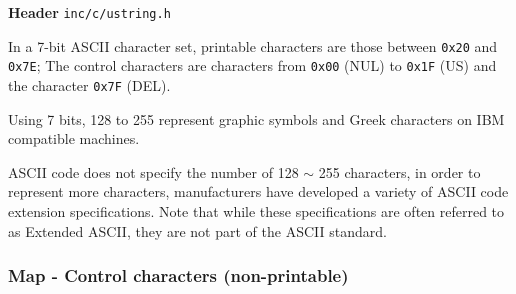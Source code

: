 \textbf{Header} \verb|inc/c/ustring.h|

In a 7-bit ASCII character set, printable characters are those between \verb|0x20| and \verb|0x7E|; The control characters are characters from \verb|0x00| (NUL) to \verb|0x1F| (US) and the character \verb|0x7F| (DEL).

Using 7 bits, 128 to 255 represent graphic symbols and Greek characters on IBM compatible machines.

ASCII code does not specify the number of 128 $\sim$ 255 characters, in order to represent more characters, manufacturers have developed a variety of ASCII code extension specifications. Note that while these specifications are often referred to as Extended ASCII, they are not part of the ASCII standard.



\subsubsection{Map - Control characters (non-printable)}

